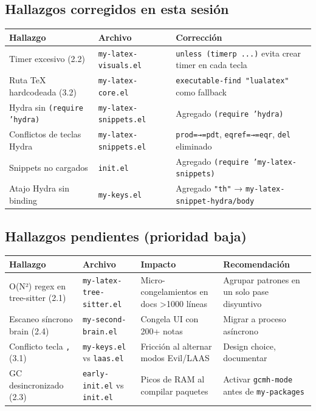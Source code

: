 \documentclass[11pt]{article}
\begin{document}
\subsection{Hallazgos corregidos en esta sesión}
\label{sec:orga828732}

\begin{center}
\begin{tabular}{lll}
Hallazgo & Archivo & Corrección\\
\hline
Timer excesivo (2.2) & \texttt{my-latex-visuals.el} & \texttt{unless (timerp ...)} evita crear timer en cada tecla\\
Ruta \TeX{} hardcodeada (3.2) & \texttt{my-latex-core.el} & \texttt{executable-find "lualatex"} como fallback\\
Hydra sin \texttt{(require 'hydra)} & \texttt{my-latex-snippets.el} & Agregado \texttt{(require 'hydra)}\\
Conflictos de teclas Hydra & \texttt{my-latex-snippets.el} & \texttt{prod=→=pdt}, \texttt{eqref=→=eqr}, \texttt{del} eliminado\\
Snippets no cargados & \texttt{init.el} & Agregado \texttt{(require 'my-latex-snippets)}\\
Atajo Hydra sin binding & \texttt{my-keys.el} & Agregado \texttt{"th"} → \texttt{my-latex-snippet-hydra/body}\\
\end{tabular}
\end{center}
\subsection{Hallazgos pendientes (prioridad baja)}
\label{sec:org2bdc6f3}

\begin{center}
\begin{tabular}{llll}
Hallazgo & Archivo & Impacto & Recomendación\\
\hline
O(N²) regex en tree-sitter (2.1) & \texttt{my-latex-tree-sitter.el} & Micro-congelamientos en docs >1000 líneas & Agrupar patrones en un solo pase disyuntivo\\
Escaneo síncrono brain (2.4) & \texttt{my-second-brain.el} & Congela UI con 200+ notas & Migrar a proceso asíncrono\\
Conflicto tecla \texttt{,} (3.1) & \texttt{my-keys.el} vs \texttt{laas.el} & Fricción al alternar modos Evil/LAAS & Design choice, documentar\\
GC desincronizado (2.3) & \texttt{early-init.el} vs \texttt{init.el} & Picos de RAM al compilar paquetes & Activar \texttt{gcmh-mode} antes de \texttt{my-packages}\\
\end{tabular}
\end{center}
\end{document}
